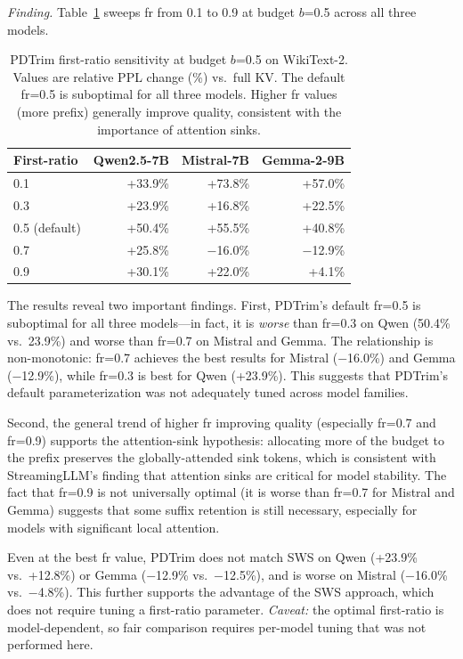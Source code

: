 \documentclass[11pt]{article}
\newcommand{\sws}{SWS}
\newcommand{\pct}{\%}
\theoremstyle{definition}
\theoremstyle{plain}
\begin{document}
\emph{Finding.}  Table~\ref{tab:fr-scan} sweeps fr from 0.1 to 0.9 at budget $b$=0.5 across all three models.

\begin{table}[t]
\centering
\caption{PDTrim first-ratio sensitivity at budget $b$=0.5 on WikiText-2.  Values are relative PPL change (\%) vs.\ full KV.  The default fr=0.5 is suboptimal for all three models.  Higher fr values (more prefix) generally improve quality, consistent with the importance of attention sinks.}
\label{tab:fr-scan}
\small
\begin{tabular}{lrrr}
\toprule
First-ratio & Qwen2.5-7B & Mistral-7B & Gemma-2-9B \\
\midrule
0.1 & +33.9\pct{} & +73.8\pct{} & +57.0\pct{} \\
0.3 & +23.9\pct{} & +16.8\pct{} & +22.5\pct{} \\
0.5 (default) & +50.4\pct{} & +55.5\pct{} & +40.8\pct{} \\
0.7 & +25.8\pct{} & $-$16.0\pct{} & $-$12.9\pct{} \\
0.9 & +30.1\pct{} & +22.0\pct{} & +4.1\pct{} \\
\bottomrule
\end{tabular}
\end{table}

The results reveal two important findings.  First, PDTrim's default fr=0.5 is suboptimal for all three models---in fact, it is \emph{worse} than fr=0.3 on Qwen (50.4\pct{} vs.\ 23.9\pct{}) and worse than fr=0.7 on Mistral and Gemma.  The relationship is non-monotonic: fr=0.7 achieves the best results for Mistral ($-$16.0\pct{}) and Gemma ($-$12.9\pct{}), while fr=0.3 is best for Qwen (+23.9\pct{}).  This suggests that PDTrim's default parameterization was not adequately tuned across model families.

Second, the general trend of higher fr improving quality (especially fr=0.7 and fr=0.9) supports the attention-sink hypothesis: allocating more of the budget to the prefix preserves the globally-attended sink tokens, which is consistent with StreamingLLM's finding that attention sinks are critical for model stability.  The fact that fr=0.9 is not universally optimal (it is worse than fr=0.7 for Mistral and Gemma) suggests that some suffix retention is still necessary, especially for models with significant local attention.

Even at the best fr value, PDTrim does not match \sws{} on Qwen (+23.9\pct{} vs.\ +12.8\pct{}) or Gemma ($-$12.9\pct{} vs.\ $-$12.5\pct{}), and is worse on Mistral ($-$16.0\pct{} vs.\ $-$4.8\pct{}).  This further supports the advantage of the \sws{} approach, which does not require tuning a first-ratio parameter.  \emph{Caveat:} the optimal first-ratio is model-dependent, so fair comparison requires per-model tuning that was not performed here.
\end{document}
